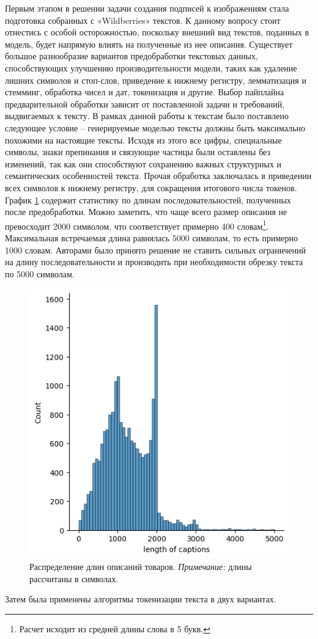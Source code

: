 \documentclass[a4paper,12pt]{extarticle}
\begin{document}
Первым этапом в решении задачи создания подписей к изображениям стала подготовка собранных с «Wildberries» текстов. К данному вопросу стоит отнестись с особой осторожностью, поскольку внешний вид текстов, поданных в модель, будет напрямую влиять на полученные из нее описания. Существует большое разнообразие вариантов предобработки текстовых данных, способствующих улучшению производительности модели, таких как удаление лишних символов и стоп-слов, приведение к нижнему регистру, лемматизация и стемминг, обработка чисел и дат, токенизация и другие. Выбор пайплайна предварительной обработки зависит от поставленной задачи и требований, выдвигаемых к тексту. В рамках данной работы к текстам было поставлено следующее условие – генерируемые моделью тексты должны быть максимально похожими на настоящие тексты. Исходя из этого все цифры, специальные символы, знаки препинания и связующие частицы были оставлены без изменений, так как они способствуют сохранению важных структурных и семантических особенностей текста. Прочая обработка заключалась в приведении всех символов к нижнему регистру, для сокращения итогового числа токенов. График \ref{fig:captions_length} содержит статистику по длинам последовательностей, полученных после предобработки. Можно заметить, что чаще всего размер описания не превосходит 2000 символом, что соответствует примерно 400 словам\footnote{Расчет исходит из средней длины слова в 5 букв.}. Максимальная встречаемая длина равнялась 5000 символам, то есть примерно 1000 словам. Авторами было принято решение не ставить сильных ограничений на длину последовательности и производить при необходимости обрезку текста по 5000 символам.
\begin{figure}[ht]
	\centering
	\includegraphics[scale=0.7]{captions_length.png}
	\caption{Распределение длин описаний товаров. \textsl{Примечание:} длины рассчитаны в символах.}
	\label{fig:captions_length}
\end{figure}
Затем была применены алгоритмы токенизации текста в двух вариантах.
\end{document}
